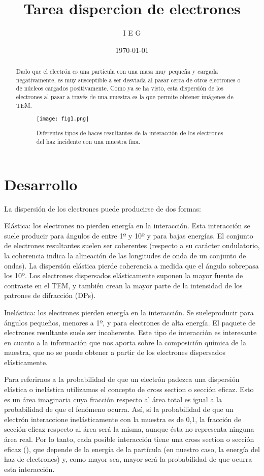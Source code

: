 \documentclass{article}
\author{I E G} %
\title{Tarea dispercion de electrones} %
\date{\today}
\begin{document}

\maketitle %

\begin{abstract} %
Dado que el electrón es una partícula con una masa muy pequeña y cargada negativamente, es muy susceptible a ser desviada al pasar cerca de otros electrones o de núcleos cargados positivamente. Como ya se ha visto, esta dispersión de los electrones al pasar a través de una muestra es la que permite obtener imágenes de TEM.


\begin{figure} [h!]%
    \centering
    \texttt{[image: fig1.png]} %
    \caption{Diferentes tipos de haces resultantes de la interacción de los electrones del haz incidente con una muestra fina.}
    \label{figura1}
\end{figure}

\end{abstract}


\section{Desarrollo}
La dispersión de los electrones puede producirse de dos formas:

Elástica: los electrones no pierden energía en la interacción. Esta interacción se suele producir para ángulos de entre 1º y 10º y para bajas energías. El conjunto de electrones resultantes suelen ser coherentes (respecto a su carácter ondulatorio, la coherencia indica la alineación de las longitudes de onda de un conjunto de ondas). La dispersión elástica pierde coherencia a medida que el ángulo sobrepasa los 10º. Los electrones dispersados elásticamente suponen la mayor fuente de contraste en el TEM, y también crean la mayor parte de la intensidad de los patrones de difracción (DPs).

Inelástica: los electrones pierden energía en la interacción. Se sueleproducir para ángulos pequeños, menores a 1º, y para electrones de alta energía. El paquete de electrones resultante suele ser incoherente. Este tipo de interacción es interesante en cuanto a la información que nos aporta sobre la composición química de la muestra, que no se puede obtener a partir de los electrones dispersados elásticamente.

Para referirnos a la probabilidad de que un electrón padezca una dispersión elástica o inelástica utilizamos el concepto de cross section o sección eficaz. Esto es un área imaginaria cuya fracción respecto al área total es igual a la probabilidad de que el fenómeno ocurra. Así, si la probabilidad de que un electrón interaccione inelásticamente con la muestra es de 0,1, la fracción de sección eficaz respecto al área será la misma, aunque ésta no representa ninguna área real. Por lo tanto, cada posible interacción tiene una cross section o sección eficaz (), que depende de la energía de la partícula (en nuestro caso, la energía del haz de electrones) y, como mayor sea, mayor será la probabilidad de que ocurra esta interacción.
\end{document}
